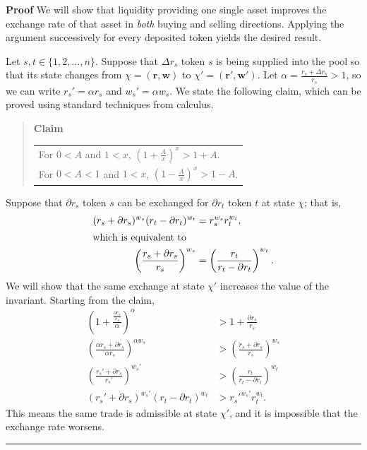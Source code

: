 \documentclass[12pt,a4paper]{article}
\newcommand{\qed}{\rule{.07in}{.1in}}
\newenvironment{proof}{\vspace{1ex}\noindent\textbf{Proof}\hspace{0.5em}}{\hfill\qed\vspace{1ex}}
\begin{document}
\begin{proof}
We will show that liquidity providing one single asset improves the exchange rate of that asset in \emph{both} buying and selling directions. Applying the argument successively for every deposited token yields the desired result.

Let $s,t\in\{1,2,\ldots,n\}$. Suppose that $\Delta r_s$ token $s$ is being supplied into the pool so that its state changes from $\chi=(\mathbf{r},\mathbf{w})$ to $\chi'=(\mathbf{r'},\mathbf{w'})$. Let $\alpha=\frac{r_s+\Delta r_s}{r_s}>1$, so we can write $r_s'=\alpha r_s$ and $w_s'=\alpha w_s$. We state the following claim, which can be proved using standard techniques from calculus.

\begin{quote}
\textbf{Claim} \begin{tabular}[t]{@{}l}
For $0<A$ and $1<x$, $\left(1+\frac{A}{x}\right)^x>1+A$. \\
For $0<A<1$ and $1<x$, $\left(1-\frac{A}{x}\right)^x>1-A$.
\end{tabular}
\end{quote}

Suppose that $\partial r_s$ token $s$ can be exchanged for $\partial r_t$ token $t$ at state $\chi$; that is,
\begin{align*}
(r_s+\partial r_s)^{w_s}(r_t-\partial r_t)^{w_t} & =r_s^{w_s}r_t^{w_t}, \\
\intertext{which is equivalent to}
\left(\frac{r_s+\partial r_s}{r_s}\right)^{w_s} & =\left(\frac{r_t}{r_t-\partial r_t}\right)^{w_t}.
\end{align*}
We will show that the same exchange at state $\chi'$ increases the value of the invariant. Starting from the claim,
\begin{align*}
\left(1+\frac{\frac{\partial r_s}{r_s}}{\alpha}\right)^\alpha & >1+\frac{\partial r_s}{r_s} \\
\left(\frac{\alpha r_s+\partial r_s}{\alpha r_s}\right)^{\alpha w_s} & >\left(\frac{r_s+\partial r_s}{r_s}\right)^{w_s} \\
\left(\frac{r_s'+\partial r_s}{r_s'}\right)^{w_s'} & >\left(\frac{r_t}{r_t-\partial r_t}\right)^{w_t} \\
(r_s'+\partial r_s)^{w_s'}(r_t-\partial r_t)^{w_t} & >r_s'^{w_s'}r_t^{w_t}.
\end{align*}
This means the same trade is admissible at state $\chi'$, and it is impossible that the exchange rate worsens.


\end{proof}
\end{document}
